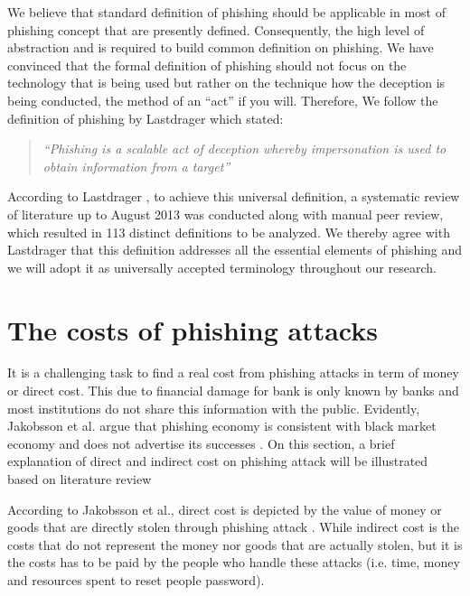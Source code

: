 We believe that standard definition of phishing should be applicable
in most of phishing concept that are presently defined. Consequently,
the high level of abstraction and is required to build common definition
on phishing. We have convinced that the formal definition of phishing
should not focus on the technology that is being used but rather on
the technique how the deception is being conducted, the method of
an ``act'' if you will. Therefore, We follow the definition of phishing
by Lastdrager \citep{lastdrager:2014} which stated: 
\begin{quote}
\textit{``Phishing is a scalable act of deception whereby impersonation
is used to obtain information from a target''}
\end{quote}
According to Lastdrager \citep{lastdrager:2014}, to achieve this
universal definition, a systematic review of literature up to August
2013 was conducted along with manual peer review, which resulted in
113 distinct definitions to be analyzed. We thereby agree with Lastdrager
\citep{lastdrager:2014} that this definition addresses all the essential
elements of phishing and we will adopt it as universally accepted
terminology throughout our research.


\section{\label{sec:cost-of-phishing}The costs of phishing attacks}

It is a challenging task to find a real cost from phishing attacks
in term of money or direct cost. This due to financial damage for
bank is only known by banks and most institutions do not share this
information with the public. Evidently, Jakobsson et al. argue that
phishing economy is consistent with black market economy and does
not advertise its successes \citep{jakobsson:2006}. On this section,
a brief explanation of direct and indirect cost on phishing attack
will be illustrated based on literature review

According to Jakobsson et al., direct cost is depicted by the value
of money or goods that are directly stolen through phishing attack
\citep{jakobsson:2006}. While indirect cost is the costs that do
not represent the money nor goods that are actually stolen, but it
is the costs has to be paid by the people who handle these attacks
\citep{jakobsson:2006} (i.e. time, money and resources spent to reset
people password).

